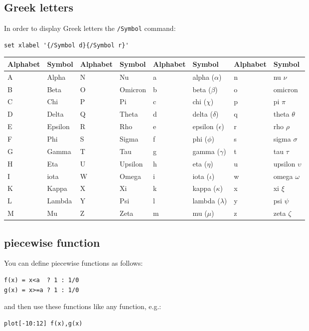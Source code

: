 \subsection*{Greek letters}

In order to display Greek letters the {\tt /Symbol} command:

\begin{verbatim}
set xlabel '{/Symbol d}{/Symbol r}' 
\end{verbatim}

\begin{tabular}{ll|ll|ll|ll}
\hline
Alphabet&Symbol  &Alphabet 	&Symbol   &Alphabet 	&Symbol  &Alphabet 	&Symbol  \\
\hline
\hline
A 	&Alpha 	 &N 		&Nu 	  &a 		&alpha ($\alpha$)     &n 		&nu  $\nu$\\
B 	&Beta 	 &O 		&Omicron  &b 		&beta  ($\beta$)      &o 		&omicron  \\
C 	&Chi 	 &P 		&Pi 	  &c 		&chi   ($\chi$)	      &p 		&pi  $\pi$\\
D 	&Delta 	 &Q 		&Theta 	  &d 		&delta  ($\delta$)    &q 		&theta $\theta$ \\
E 	&Epsilon &R 		&Rho 	  &e 		&epsilon ($\epsilon$) &r 		&rho  $\rho$\\
F 	&Phi 	 &S 		&Sigma 	  &f 		&phi 	($\phi$)      &s 		&sigma  $\sigma$\\
G 	&Gamma 	 &T 		&Tau 	  &g 		&gamma 	($\gamma$)    &t 		&tau  $\tau$\\
H 	&Eta 	 &U 		&Upsilon  &h 		&eta 	($\eta$)      &u 		&upsilon  $\upsilon$\\
I 	&iota 	 &W 		&Omega 	  &i 		&iota 	($\iota$)     &w 		&omega  $\omega$\\
K 	&Kappa 	 &X 		&Xi 	  &k 		&kappa 	($\kappa$)    &x 		&xi  $\xi$\\
L 	&Lambda  &Y 		&Psi 	  &l 		&lambda  ($\lambda$)  &y 		&psi  $\psi$\\
M 	&Mu 	 &Z 		&Zeta 	  &m 		&mu 	($\mu$)       &z 		&zeta $\zeta$\\
\hline
\end{tabular}


\subsection*{piecewise function}

You can define piecewise functions as follows:
\begin{verbatim}
f(x) = x<a  ? 1 : 1/0
g(x) = x>=a ? 1 : 1/0 
\end{verbatim}
and then use these functions like any function, e.g.:
\begin{verbatim}
plot[-10:12] f(x),g(x)
\end{verbatim}



